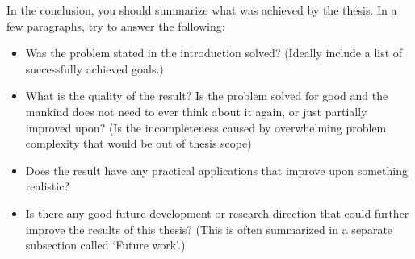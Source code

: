 

In the conclusion, you should summarize what was achieved by the thesis. In a few paragraphs, try to answer the following:
\begin{itemize}
\item Was the problem stated in the introduction solved? (Ideally include a list of successfully achieved goals.)
\item What is the quality of the result? Is the problem solved for good and the mankind does not need to ever think about it again, or just partially improved upon? (Is the incompleteness caused by overwhelming problem complexity that would be out of thesis scope)%
\item Does the result have any practical applications that improve upon something realistic?
\item Is there any good future development or research direction that could further improve the results of this thesis? (This is often summarized in a separate subsection called `Future work'.)
\end{itemize}
